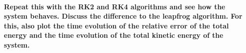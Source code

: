 \paragraph{Repeat this with the RK2 and RK4 algorithms and see how the 
    system behaves. Discuss the difference to the leapfrog algorithm.
    For this, also plot the time evolution of the relative error 
    of the total energy and the time evolution of the total kinetic
    energy of the system.
} \ \\ 
\\

